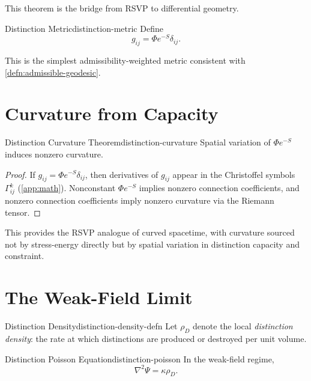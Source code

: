 \documentclass[12pt,twoside,openright]{book}
\begin{document}
This theorem is the bridge from RSVP to differential
geometry.

\begin{definition}{Distinction Metric}{distinction-metric}
  Define
  \[
    g_{ij} = \Phi e^{-S} \delta_{ij}.
  \]
\end{definition}

This is the simplest admissibility-weighted metric
consistent with \cref{defn:admissible-geodesic}.

\section{Curvature from Capacity}
\label{sec:ch17-curvature}

\begin{theorem}{Distinction Curvature Theorem}{distinction-curvature}
  Spatial variation of $\Phi e^{-S}$ induces nonzero
  curvature.
\end{theorem}

\begin{proof}
  If $g_{ij} = \Phi e^{-S}\delta_{ij}$, then derivatives of
  $g_{ij}$ appear in the Christoffel symbols
  $\Gamma^k_{ij}$ (\cref{app:math}). Nonconstant
  $\Phi e^{-S}$ implies nonzero connection coefficients,
  and nonzero connection coefficients imply nonzero
  curvature via the Riemann tensor.
\end{proof}

This provides the RSVP analogue of curved spacetime, with
curvature sourced not by stress-energy directly but by
spatial variation in distinction capacity and constraint.

\section{The Weak-Field Limit}
\label{sec:ch17-weakfield}

\begin{definition}{Distinction Density}{distinction-density-defn}
  Let $\rho_D$ denote the local \emph{distinction density}:
  the rate at which distinctions are produced or destroyed
  per unit volume.
\end{definition}

\begin{theorem}{Distinction Poisson Equation}{distinction-poisson}
  In the weak-field regime,
  \[
    \nabla^2 \Psi = \kappa \rho_D.
  \]
\end{theorem}
\end{document}
